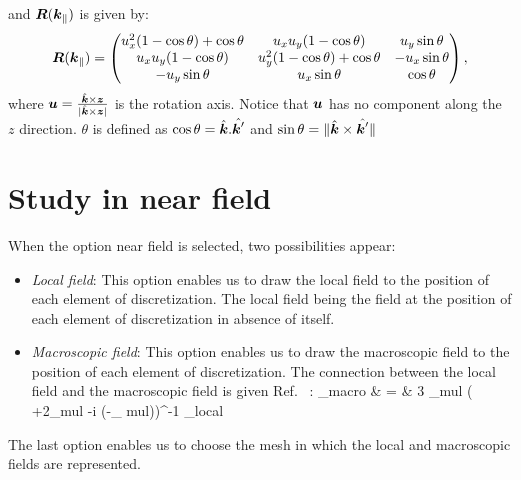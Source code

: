 and $\boldsymbol{R}(\boldsymbol{k}_\parallel)$ is given by:
\begin{equation}
\boldsymbol{R}(\boldsymbol{k}_\parallel)=
\begin{pmatrix}
  u_{x}^2(1-\cos\theta)+\cos\theta & u_{x} u_{y}(1-\cos\theta) & u_{y}
  \sin\theta \\ u_{x} u_{y}(1-\cos\theta) &
  u_{y}^2(1-\cos\theta)+\cos\theta & -u_{x} \sin\theta\\ -u_{y}
  \sin\theta & u_{x} \sin\theta & \cos\theta
\end{pmatrix},
\end{equation}
where $\boldsymbol{u}=\frac{\hat{\boldsymbol{k}}\times\boldsymbol{z}}{\mid \hat{\boldsymbol{k}} \times
  \boldsymbol{z} \mid}$ is the rotation axis. Notice that $\boldsymbol{u}$ has no
component along the $z$ direction. $\theta$ is defined as $\cos
\theta=\hat{\boldsymbol{k}}.\hat{\boldsymbol{k}'} $ and $\sin
\theta=\|\hat{\boldsymbol{k}}\times \hat{\boldsymbol{k}'}\|$


\section{Study in near field}

When the option near field is selected, two possibilities appear:

\begin{itemize}

\item {\it Local field}: This option enables us to draw the local
  field to the position of each element of discretization. The local
  field being the field at the position of each element of
  discretization in absence of itself. 

\item {\it Macroscopic field}: This option enables us to draw the
  macroscopic field to the position of each element of
  discretization. The connection between the local field and the
  macroscopic field is given Ref.~\cite{Chaumet_PRE_04} :
  \be {}_{\rm macro} & = & 3 \varepsilon_{\rm mul} \left(
  \varepsilon+2\varepsilon_{\rm mul} -i  (\varepsilon-\varepsilon_{\rm
    mul})\right)^{-1} _{\rm local} \ee


\end{itemize}

The last option enables us to choose the mesh in which the local and
macroscopic fields are represented.

